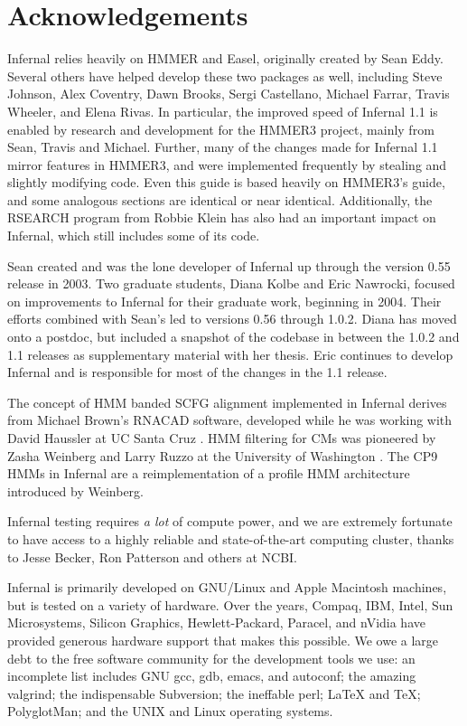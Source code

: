 \section{Acknowledgements}

Infernal relies heavily on HMMER and Easel, originally created by Sean
Eddy. Several others have helped develop these two packages as well,
including Steve Johnson, Alex Coventry, Dawn Brooks, Sergi Castellano,
Michael Farrar, Travis Wheeler, and Elena Rivas.  In particular, the
improved speed of Infernal 1.1 is enabled by research and development
for the HMMER3 project, mainly from Sean, Travis and Michael. Further,
many of the changes made for Infernal 1.1 mirror features in HMMER3,
and were implemented frequently by stealing and slightly modifying
code. Even this guide is based heavily on HMMER3's guide, and some
analogous sections are identical or near identical.  Additionally, the
RSEARCH program \citep{KleinEddy03} from Robbie Klein has also had an
important impact on Infernal, which still includes some of its code.

Sean created and was the lone developer of Infernal up through the
version 0.55 release in 2003. Two graduate students, Diana Kolbe and
Eric Nawrocki, focused on improvements to Infernal for their graduate
work, beginning in 2004. Their efforts combined with Sean's led to
versions 0.56 through 1.0.2. Diana has moved onto a postdoc, but
included a snapshot of the codebase in between the 1.0.2 and 1.1
releases as supplementary material with her thesis. Eric continues to
develop Infernal and is responsible for most of the changes in the 1.1
release.

The concept of HMM banded SCFG alignment implemented in Infernal
derives from Michael Brown's RNACAD software, developed while he was
working with David Haussler at UC Santa Cruz \citep{Brown00}. HMM
filtering for CMs was pioneered by Zasha Weinberg and Larry Ruzzo at
the University of Washington
\citep{WeinbergRuzzo04,WeinbergRuzzo04b,WeinbergRuzzo06}. The CP9 HMMs
in Infernal are a reimplementation of a profile HMM architecture
introduced by Weinberg.

Infernal testing requires \emph{a lot} of compute power, and we are
extremely fortunate to have access to a highly reliable and
state-of-the-art computing cluster, thanks to Jesse Becker, Ron
Patterson and others at NCBI.

Infernal is primarily developed on GNU/Linux and Apple Macintosh
machines, but is tested on a variety of hardware. Over the years,
Compaq, IBM, Intel, Sun Microsystems, Silicon Graphics,
Hewlett-Packard, Paracel, and nVidia have provided generous hardware
support that makes this possible. We owe a large debt to the free
software community for the development tools we use: an incomplete
list includes GNU gcc, gdb, emacs, and autoconf; the amazing valgrind;
the indispensable Subversion; the ineffable perl; LaTeX and TeX;
PolyglotMan; and the UNIX and Linux operating systems.

\label{manualend}
